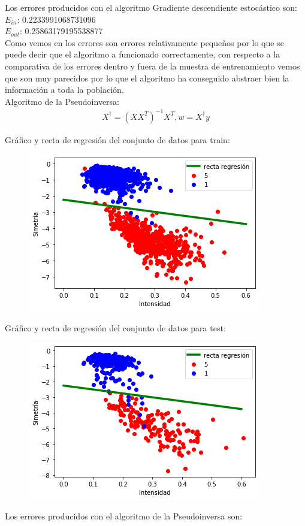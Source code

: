 \documentclass[a4paper,11pt]{article}
\begin{document}
Los errores producidos con el algoritmo Gradiente descendiente estocástico son:\\

$E_{in}$:  0.2233991068731096\\
$E_{out}$:  0.25863179195538877\\

Como vemos en los errores son errores relativamente pequeños por lo que se puede decir que el algoritmo a funcionado correctamente, con respecto a la comparativa de los errores dentro y fuera de la muestra de entrenamiento vemos que son muy parecidos por lo que el algoritmo ha conseguido abstraer bien la información a toda la población.\\

Algoritmo de la \textsf{Pseudoinversa}:
\begin{align*}
X^{\dagger}=(XX^{T})^{-1}X^{T} , w=X^{\dagger}y
\end{align*}

Gráfico y recta de regresión del conjunto de datos para train:\\

\begin{figure}[h]
\includegraphics[scale=0.5]{grafica3ej2.1}
\centering
\end{figure}

Gráfico y recta de regresión del conjunto de datos para test:\\

\begin{figure}[h]
\includegraphics[scale=0.5]{grafica4ej2.1}
\centering
\end{figure}
\newpage
Los errores producidos con el algoritmo de la Pseudoinversa son:\\
\end{document}
